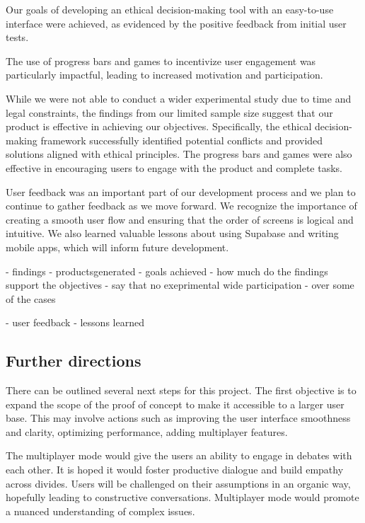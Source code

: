\documentclass{article}
\begin{document}
Our goals of developing an ethical decision-making tool with an easy-to-use interface were achieved, as evidenced by the positive feedback from initial user tests.

The use of progress bars and games to incentivize user engagement was particularly impactful, leading to increased motivation and participation.

While we were not able to conduct a wider experimental study due to time and legal constraints, the findings from our limited sample size suggest that our product is effective in achieving our objectives. 
Specifically, the ethical decision-making framework successfully identified potential conflicts and provided solutions aligned with ethical principles. The progress bars and games were also effective in encouraging users to engage with the product and complete tasks.

User feedback was an important part of our development process and we plan to continue to gather feedback as we move forward. We recognize the importance of creating a smooth user flow and ensuring that the order of screens is logical and intuitive. We also learned valuable lessons about using Supabase and writing mobile apps, which will inform future development.

- findings - productsgenerated
- goals achieved - how much do the findings support the objectives
- say that no exeprimental wide participation
-  over some of the cases

- user feedback
- lessons learned


\blindtext

\subsection{Further directions}
There can be outlined several next steps for this project. The first objective is to expand the scope of the proof of concept to make it accessible to a larger user base. This may involve actions such as improving the user interface smoothness and clarity, optimizing performance, adding multiplayer features.

The multiplayer mode would give the users an ability to engage in debates with each other. It is hoped it would foster productive dialogue and build empathy across divides.
Users will be challenged on their assumptions in an organic way, hopefully leading to constructive conversations. Multiplayer mode would promote a nuanced understanding of complex issues.
\end{document}
